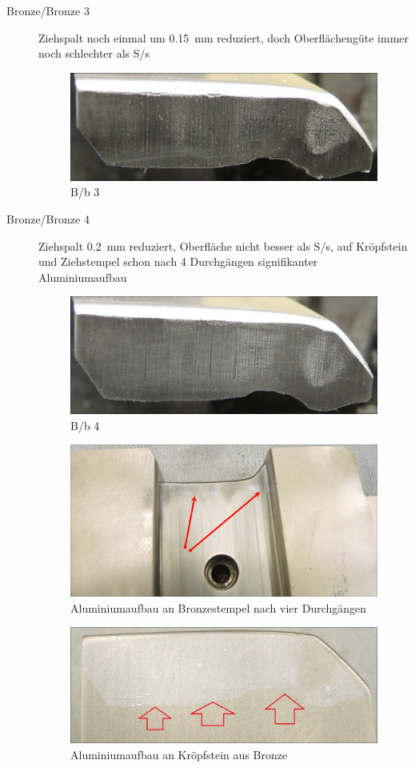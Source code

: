 \documentclass[12pt,a4paper,parskip]{scrartcl}
\begin{document}
\begin{description}
\item[Bronze/Bronze 3] Ziehspalt noch einmal um \SI{0.15}{\milli\meter}  reduziert, doch Oberflächengüte immer noch schlechter als S/s
\begin{figure}[H]
\centering
\includegraphics[width=.8\textwidth]{Bb3a}
\caption{B/b 3}
\label{fig:Bb3a}
\end{figure}

\item[Bronze/Bronze 4] Ziehspalt \SI{0.2}{\milli\meter} reduziert, Oberfläche nicht besser als S/s, auf Kröpfstein und Ziehstempel schon nach 4 Durchgängen signifikanter Aluminiumaufbau
\begin{figure}[H]
\centering
\includegraphics[width=.8\textwidth]{Bb4}
\caption{B/b 4}
\label{fig:Bb4}
\end{figure}
\begin{figure}[H]
\centering
\includegraphics[width=.8\textwidth]{PunchBAlubau}
\caption{Aluminiumaufbau an Bronzestempel nach vier Durchgängen}
\label{fig:PunchBAlubau}
\end{figure}
\begin{figure}[H]
\centering
\includegraphics[width=.8\textwidth]{DieBAlubau}
\caption{Aluminiumaufbau an Kröpfstein aus Bronze}
\label{fig:DieBAlubauMark}
\end{figure}


\end{description}
\end{document}
